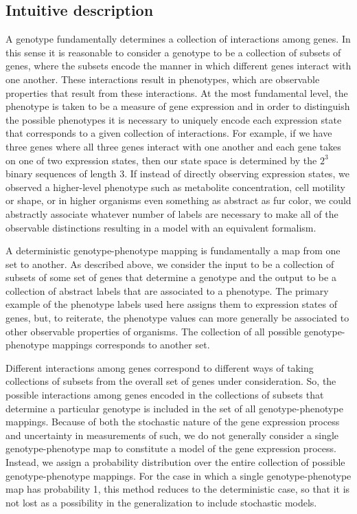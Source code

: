 
\def\viable{\mathcal{U}}
\def\expression{\mathcal{E}}
\def\dist{\mathcal{D}}

\subsection{Intuitive description}\label{sec:intuition}
A genotype fundamentally determines a collection of interactions among genes. In this sense it is reasonable to consider a genotype to be a collection of subsets of genes, where the subsets encode the manner in which different genes interact with one another. These interactions result in phenotypes, which are observable properties that result from these interactions. At the most fundamental level, the phenotype is taken to be a measure of gene expression and in order to distinguish the possible phenotypes it is necessary to uniquely encode each expression state that corresponds to a given collection of interactions. For example, if we have three genes where all three genes interact with one another and each gene takes on one of two expression states, then our state space is determined by the $2^3$ binary sequences of length $3$. If instead of directly observing expression states, we observed a higher-level phenotype such as metabolite concentration, cell motility or shape, or in higher organisms even something as abstract as fur color, we could abstractly associate whatever number of labels are necessary to make all of the observable distinctions resulting in a model with an equivalent formalism.

A deterministic genotype-phenotype mapping is fundamentally a map from one set to another. As described above, we consider the input to be a collection of subsets of some set of genes that determine a genotype and the output to be a collection of abstract labels that are associated to a phenotype. The primary example of the phenotype labels used here assigns them to expression states of genes, but, to reiterate, the phenotype values can more generally be associated to other observable properties of organisms. The collection of all possible genotype-phenotype mappings corresponds to another set.

Different interactions among genes correspond to different ways of taking collections of subsets from the overall set of genes under consideration. So, the possible interactions among genes encoded in the collections of subsets that determine a particular genotype is included in the set of all genotype-phenotype mappings. Because of both the stochastic nature of the gene expression process and uncertainty in measurements of such, we do not generally consider a single genotype-phenotype map to constitute a model of the gene expression process. Instead, we assign a probability distribution over the entire collection of possible genotype-phenotype mappings. For the case in which a single genotype-phenotype map has probability 1, this method reduces to the deterministic case, so that it is not lost as a possibility in the generalization to include stochastic models.

